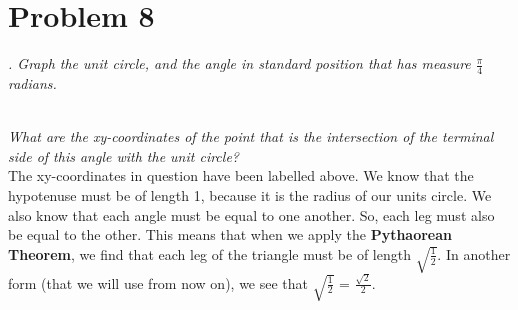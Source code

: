 \documentclass[11pt]{article} %
\newcommand\tab[1][1cm]{\hspace*{#1}}
\begin{document}
\section{Problem 8}
\textit{. Graph the unit circle, and the angle in standard position that has measure $\frac{\pi}{4}$ radians.}
\\
\textit{What are the xy-coordinates of the point that is the intersection of the terminal side of this angle with the unit circle?}\\
\tab The xy-coordinates in question have been labelled above. We know that the hypotenuse must be of length 1, because it is the radius of our units circle. We also know that each angle must be equal to one another. So, each leg must also be equal to the other. This means that when we apply the \textbf{Pythaorean Theorem}, we find that each leg of the triangle must be of length $\sqrt{\frac{1}{2}}$.  In another form (that we will use from now on), we see that $\sqrt{\frac{1}{2}}$ = $\frac{\sqrt{2}}{2}$.
\end{document}
